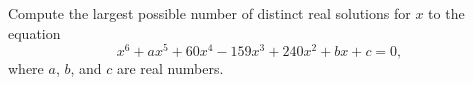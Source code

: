 Compute the largest possible number of distinct real solutions for $x$ to the equation \[x^6+ax^5+60x^4-159x^3+240x^2+bx+c=0,\] where $a$, $b$, and $c$ are real numbers.
